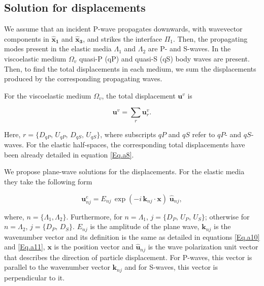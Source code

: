 \documentclass[draft]{agujournal2019}
\begin{document}
\subsection{Solution for displacements}
We assume that an incident P-wave propagates downwards, with wavevector components in $\bm{\hat x_1}$ and  $\bm{\hat x_3}$, and strikes the interface $\Pi_1$. Then, the propagating modes present in the elastic media $\Lambda_1$ and $\Lambda_2$ are P- and S-waves. In the viscoelastic medium $\Omega_v$ quasi-P (qP)  and quasi-S (qS) body waves are present. 
Then, to find the total displacements in each medium, we sum the displacements produced by the corresponding propagating waves.

For the viscoelastic medium $\Omega_v$, the total displacement $\bm{u}^v$ is
\begin{linenomath*}
\begin{equation}\label{Eq.b3}
\bm{u}^v=  \sum_r \bm{u}_{r}^v.
\end{equation}
\end{linenomath*}
Here, $r=\{D_{qP},\,U_{qP},\, D_{qS},\,U_{qS}\}$, where subscripts $qP$ and $qS$ refer to $qP$- and $qS$-waves.
For the elastic half-spaces, the corresponding total displacements have been already detailed in equation \eqref{Eq.a8}.

We propose plane-wave solutions for the displacements. For the elastic media they take the following form
\begin{linenomath*}
\begin{equation}\label{Eq.b4}
\bm{u}_{nj}^e = E_{nj}\, \exp (- i \,\bm{k}_{nj} \cdot \bm {x} ) \; \bm{\hat {u}}_{nj},
\end{equation}
\end{linenomath*}

where, $n=\{ \Lambda_1,\Lambda_2 \}$. Furthermore, for $n =\Lambda_1 $,  $j=\{D_P,\,U_P,\,U_S\}$; otherwise for $n =\Lambda_2 $, $j=\{D_P,\,D_S\}$. $ E_{nj}$ is the amplitude of the plane wave,  $\bm{k}_{nj}$ is the 
wavenumber vector and its definition is the same as detailed in equations \eqref{Eq.a10} and \eqref{Eq.a11},
$\bm {x}$ is the position vector and $\bm{\hat {u}}_{nj}$ is the wave polarization unit vector that describes the direction of particle displacement. For P-waves, this vector is parallel to the wavenumber vector $\bm{k}_{nj}$ and for S-waves, this vector is perpendicular to it.
\end{document}
